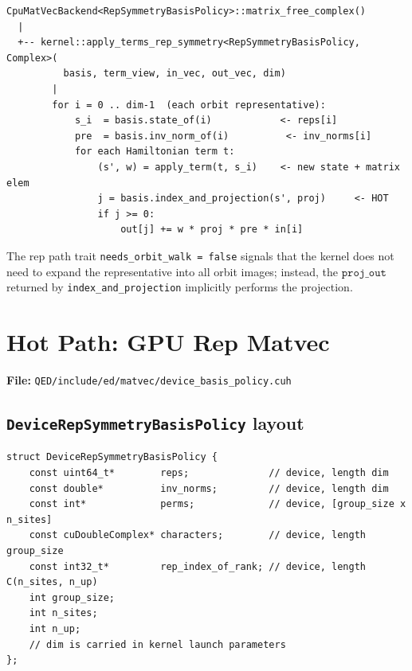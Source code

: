 \documentclass[11pt,a4paper]{article}
\begin{document}
\begin{lstlisting}[style=pseudo, caption={CPU rep-symmetry matvec kernel structure}]
CpuMatVecBackend<RepSymmetryBasisPolicy>::matrix_free_complex()
  |
  +-- kernel::apply_terms_rep_symmetry<RepSymmetryBasisPolicy, Complex>(
          basis, term_view, in_vec, out_vec, dim)
        |
        for i = 0 .. dim-1  (each orbit representative):
            s_i  = basis.state_of(i)            <- reps[i]
            pre  = basis.inv_norm_of(i)          <- inv_norms[i]
            for each Hamiltonian term t:
                (s', w) = apply_term(t, s_i)    <- new state + matrix elem
                j = basis.index_and_projection(s', proj)     <- HOT
                if j >= 0:
                    out[j] += w * proj * pre * in[i]
\end{lstlisting}

The rep path trait \texttt{needs\_orbit\_walk = false} signals that the
kernel does not need to expand the representative into all orbit images;
instead, the $\texttt{proj\_out}$ returned by \texttt{index\_and\_projection}
implicitly performs the projection.

\section{Hot Path: GPU Rep Matvec}
\label{sec:gpu}

\textbf{File:} \texttt{QED/include/ed/matvec/device\_basis\_policy.cuh}

\subsection{\texttt{DeviceRepSymmetryBasisPolicy} layout}

\begin{lstlisting}[caption={GPU rep-symmetry basis policy (device pointers)}]
struct DeviceRepSymmetryBasisPolicy {
    const uint64_t*        reps;              // device, length dim
    const double*          inv_norms;         // device, length dim
    const int*             perms;             // device, [group_size x n_sites]
    const cuDoubleComplex* characters;        // device, length group_size
    const int32_t*         rep_index_of_rank; // device, length C(n_sites, n_up)
    int group_size;
    int n_sites;
    int n_up;
    // dim is carried in kernel launch parameters
};
\end{lstlisting}
\end{document}
